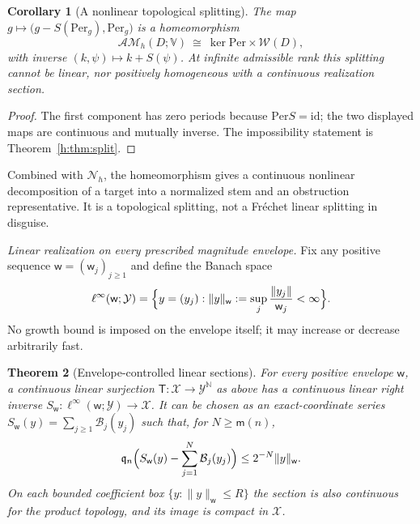 \documentclass[11pt,a4paper]{article}
\numberwithin{equation}{section}
\newtheorem{theorem}{Theorem}[section]
\newtheorem{corollary}[theorem]{Corollary}
\theoremstyle{definition}
\theoremstyle{remark}
\theoremstyle{plain}
\newcommand{\AM}{\mathcal{AM}}
\newcommand{\Per}{\mathrm{Per}}
\newcommand{\norm}[1]{\lVert #1\rVert}
\newcommand{\VV}{\mathbb V}                       %
\begin{document}
\begin{corollary}[A nonlinear topological splitting]
\label{h:cor:homeomorphism}
The map $g\mapsto\bigl(g-S(\Per_g),\Per_g\bigr)$ is a homeomorphism
\begin{equation}\label{h:eq:homeomorphism}
 \AM_h(D;\VV)\ \cong\ \ker\Per\times\mathscr W(D),
\end{equation}
with inverse $(k,\psi)\mapsto k+S(\psi)$. At infinite admissible rank this
splitting cannot be linear, nor positively homogeneous with a continuous
realization section.
\end{corollary}

\begin{proof}
The first component has zero periods because $\Per S=\mathrm{id}$; the two
displayed maps are continuous and mutually inverse. The impossibility statement
is Theorem~\ref{h:thm:split}.
\end{proof}

Combined with $\mathcal N_h$, the homeomorphism gives a continuous nonlinear
decomposition of a target into a normalized stem and an obstruction
representative. It is a topological splitting, not a Fr\'echet linear
splitting in disguise.

\emph{Linear realization on every prescribed magnitude envelope.} Fix any
positive sequence $\mathsf w=(\mathsf w_j)_{j\ge1}$ and define the Banach space
\begin{equation}\label{h:eq:weighted-space}
 \ell^\infty(\mathsf w;\mathcal Y)=\Bigl\{y=(y_j):
 \norm y_{\mathsf w}:=\sup_j\frac{\norm{y_j}}{\mathsf w_j}<\infty\Bigr\}.
\end{equation}
No growth bound is imposed on the envelope itself; it may increase or decrease
arbitrarily fast.

\begin{theorem}[Envelope-controlled linear sections]\label{h:thm:weighted}
For every positive envelope $\mathsf w$, a continuous linear surjection
$\mathsf T:\mathcal X\to\mathcal Y^{\mathbb N}$ as above has a continuous linear
right inverse $S_{\mathsf w}:\ell^\infty(\mathsf w;\mathcal Y)\to\mathcal X$. It
can be chosen as an exact-coordinate series
$S_{\mathsf w}(y)=\sum_{j\ge1}\mathcal B_j(y_j)$ such that, for
$N\ge\mathsf m(n)$,
\begin{equation}\label{h:eq:weighted-tail}
 \mathfrak q_n\Bigl(S_{\mathsf w}(y)-\sum_{j=1}^N\mathcal B_j(y_j)\Bigr)
 \le2^{-N}\norm y_{\mathsf w}.
\end{equation}
On each bounded coefficient box $\{y:\norm y_{\mathsf w}\le R\}$ the section is
also continuous for the product topology, and its image is compact in
$\mathcal X$.
\end{theorem}
\end{document}
